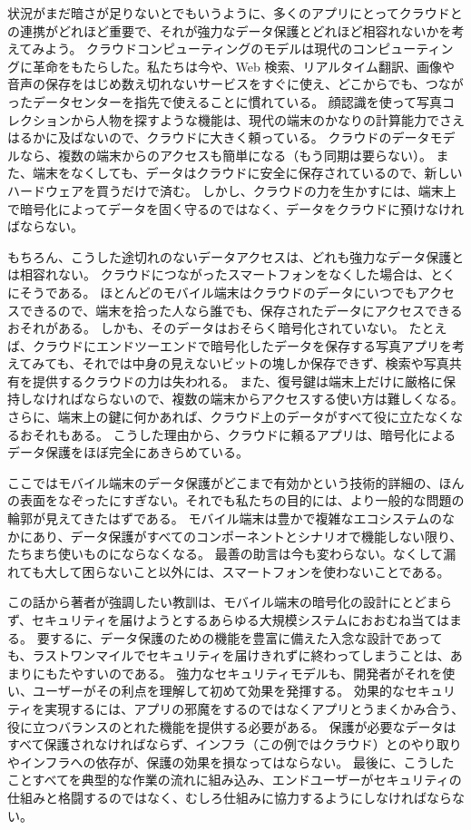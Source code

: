 \documentclass[uplatex]{jsarticle}
\begin{document}
状況がまだ暗さが足りないとでもいうように、多くのアプリにとってクラウドとの連携がどれほど重要で、それが強力なデータ保護とどれほど相容れないかを考えてみよう。
クラウドコンピューティングのモデルは現代のコンピューティングに革命をもたらした。私たちは今や、Web 検索、リアルタイム翻訳、画像や音声の保存をはじめ数え切れないサービスをすぐに使え、どこからでも、つながったデータセンターを指先で使えることに慣れている。
顔認識を使って写真コレクションから人物を探すような機能は、現代の端末のかなりの計算能力でさえはるかに及ばないので、クラウドに大きく頼っている。
クラウドのデータモデルなら、複数の端末からのアクセスも簡単になる（もう同期は要らない）。
また、端末をなくしても、データはクラウドに安全に保存されているので、新しいハードウェアを買うだけで済む。
しかし、クラウドの力を生かすには、端末上で暗号化によってデータを固く守るのではなく、データをクラウドに預けなければならない。

もちろん、こうした途切れのないデータアクセスは、どれも強力なデータ保護とは相容れない。
クラウドにつながったスマートフォンをなくした場合は、とくにそうである。
ほとんどのモバイル端末はクラウドのデータにいつでもアクセスできるので、端末を拾った人なら誰でも、保存されたデータにアクセスできるおそれがある。
しかも、そのデータはおそらく暗号化されていない。
たとえば、クラウドにエンドツーエンドで暗号化したデータを保存する写真アプリを考えてみても、それでは中身の見えないビットの塊しか保存できず、検索や写真共有を提供するクラウドの力は失われる。
また、復号鍵は端末上だけに厳格に保持しなければならないので、複数の端末からアクセスする使い方は難しくなる。
さらに、端末上の鍵に何かあれば、クラウド上のデータがすべて役に立たなくなるおそれもある。
こうした理由から、クラウドに頼るアプリは、暗号化によるデータ保護をほぼ完全にあきらめている。

ここではモバイル端末のデータ保護がどこまで有効かという技術的詳細の、ほんの表面をなぞったにすぎない。それでも私たちの目的には、より一般的な問題の輪郭が見えてきたはずである。
モバイル端末は豊かで複雑なエコシステムのなかにあり、データ保護がすべてのコンポーネントとシナリオで機能しない限り、たちまち使いものにならなくなる。
最善の助言は今も変わらない。なくして漏れても大して困らないこと以外には、スマートフォンを使わないことである。

この話から著者が強調したい教訓は、モバイル端末の暗号化の設計にとどまらず、セキュリティを届けようとするあらゆる大規模システムにおおむね当てはまる。
要するに、データ保護のための機能を豊富に備えた入念な設計であっても、ラストワンマイルでセキュリティを届けきれずに終わってしまうことは、あまりにもたやすいのである。
強力なセキュリティモデルも、開発者がそれを使い、ユーザーがその利点を理解して初めて効果を発揮する。
効果的なセキュリティを実現するには、アプリの邪魔をするのではなくアプリとうまくかみ合う、役に立つバランスのとれた機能を提供する必要がある。
保護が必要なデータはすべて保護されなければならず、インフラ（この例ではクラウド）とのやり取りやインフラへの依存が、保護の効果を損なってはならない。
最後に、こうしたことすべてを典型的な作業の流れに組み込み、エンドユーザーがセキュリティの仕組みと格闘するのではなく、むしろ仕組みに協力するようにしなければならない。
\end{document}
